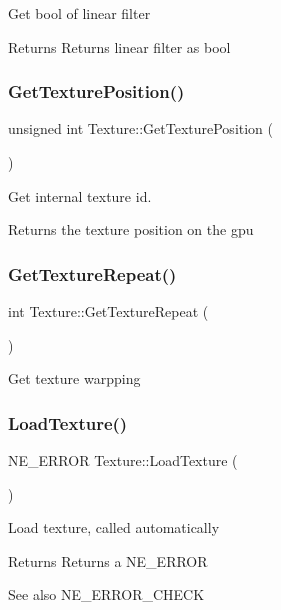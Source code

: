 Get bool of linear filter \begin{DoxyReturn}{Returns}
Returns linear filter as bool 
\end{DoxyReturn}
\mbox{\label{class_texture_a9127dfd2ef2fbaf9de3fb7c16bc6691c}} 
\subsubsection{\texorpdfstring{GetTexturePosition()}{GetTexturePosition()}}
{\footnotesize\ttfamily unsigned int Texture\+::\+Get\+Texture\+Position (\begin{DoxyParamCaption}{ }\end{DoxyParamCaption})}



Get internal texture id. 

Returns the texture position on the gpu \mbox{\label{class_texture_a9e04e6e4775b9b920d574fd7cadee235}} 
\subsubsection{\texorpdfstring{GetTextureRepeat()}{GetTextureRepeat()}}
{\footnotesize\ttfamily int Texture\+::\+Get\+Texture\+Repeat (\begin{DoxyParamCaption}{ }\end{DoxyParamCaption})}

Get texture warpping \mbox{\label{class_texture_a9c888d7e8a19dc132fee9bd6eafd57cd}} 
\subsubsection{\texorpdfstring{LoadTexture()}{LoadTexture()}}
{\footnotesize\ttfamily N\+E\+\_\+\+E\+R\+R\+OR Texture\+::\+Load\+Texture (\begin{DoxyParamCaption}{ }\end{DoxyParamCaption})}

Load texture, called automatically \begin{DoxyReturn}{Returns}
Returns a N\+E\+\_\+\+E\+R\+R\+OR 
\end{DoxyReturn}
\begin{DoxySeeAlso}{See also}
N\+E\+\_\+\+E\+R\+R\+O\+R\+\_\+\+C\+H\+E\+CK 
\end{DoxySeeAlso}
\mbox{\label{class_texture_a70791f39d7bef6d2db881873f53e8072}} 
